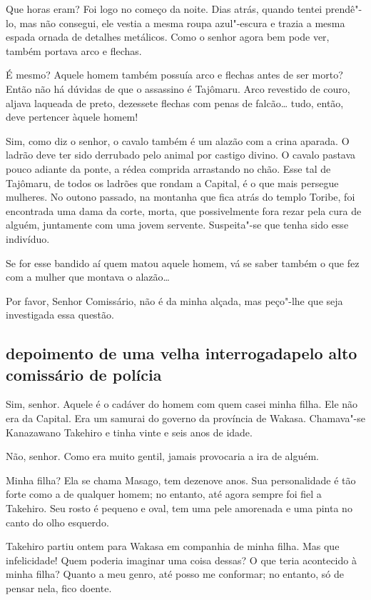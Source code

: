 Que horas eram? Foi logo no começo da noite. Dias atrás, quando tentei
prendê"-lo, mas não consegui, ele vestia a mesma roupa azul"-escura e
trazia a mesma espada ornada de detalhes metálicos. Como o senhor agora
bem pode ver, também portava arco e flechas.

É mesmo? Aquele homem também possuía arco e flechas antes de ser morto?
Então não há dúvidas de que o assassino é Tajômaru. Arco revestido de
couro, aljava laqueada de preto, dezessete flechas com penas de
falcão\ldots{} tudo, então, deve pertencer àquele homem!

Sim, como diz o senhor, o cavalo também é um alazão com a crina aparada.
O ladrão deve ter sido derrubado pelo animal por castigo divino. O
cavalo pastava pouco adiante da ponte, a rédea comprida arrastando no
chão. Esse tal de Tajômaru, de todos os ladrões que rondam a Capital, é
o que mais persegue mulheres. No outono passado, na montanha que fica
atrás do templo Toribe, foi encontrada uma dama da corte, morta, que
possivelmente fora rezar pela cura de alguém, juntamente com uma jovem
servente. Suspeita"-se que tenha sido esse indivíduo.

Se for esse bandido aí quem matou aquele homem, vá se saber também o que
fez com a mulher que montava o alazão…

Por favor, Senhor Comissário, não é da minha alçada, mas peço"-lhe que
seja investigada essa questão.

\subsection*{depoimento de uma velha interrogada\break pelo alto comissário de polícia}

Sim, senhor. Aquele é o cadáver do homem com quem casei minha filha. Ele
não era da Capital. Era um samurai do governo da província de Wakasa.
Chamava"-se Kanazawano Takehiro e tinha vinte e seis anos de idade.

Não, senhor. Como era muito gentil, jamais provocaria a ira de alguém.

Minha filha? Ela se chama Masago, tem dezenove anos. Sua personalidade é
tão forte como a de qualquer homem; no entanto, até agora sempre foi
fiel a Takehiro. Seu rosto é pequeno e oval, tem uma pele amorenada e
uma pinta no canto do olho esquerdo.

Takehiro partiu ontem para Wakasa em companhia de minha filha. Mas que
infelicidade! Quem poderia imaginar uma coisa dessas? O que teria
acontecido à minha filha? Quanto a meu genro, até posso me conformar;
no entanto, só de pensar nela, fico doente.

